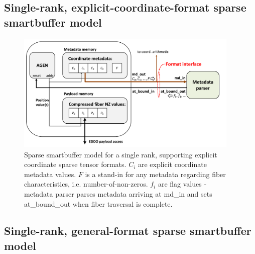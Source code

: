 \subsection{Single-rank, explicit-coordinate-format sparse smartbuffer model}

\begin{figure}[ht]
    \centering
    \includegraphics[width=0.95\textwidth]{figures/single_rank_explicit_coordinate_smartbuffer_model.png}
    \caption{Sparse smartbuffer model for a single rank, supporting explicit coordinate sparse tensor formats. ${C_i}$ are explicit coordinate metadata values. $F$ is a stand-in for any metadata regarding fiber characteristics, i.e. number-of-non-zeros. ${f_i}$ are flag values - metadata parser parses metadata arriving at md\_in and sets at\_bound\_out when fiber traversal is complete.}
    \label{fig:single_rank_explicit_coordinate_smartbuffer_model}
\end{figure}

\subsection{Single-rank, general-format sparse smartbuffer model}

